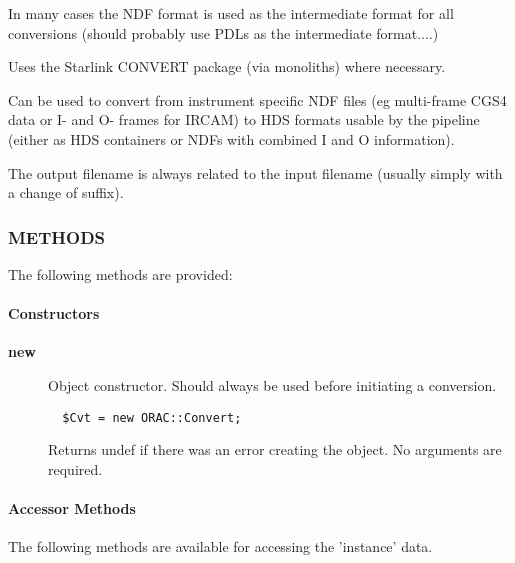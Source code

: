 In many cases the NDF format is used as the intermediate format for
all conversions (should probably use PDLs as the intermediate
format....)



Uses the Starlink CONVERT package (via monoliths) where necessary.



Can be used to convert from instrument specific NDF files (eg
multi-frame CGS4 data or I- and O- frames for IRCAM) to HDS formats
usable by the pipeline (either as HDS containers or NDFs with combined
I and O information).



The output filename is always related to the input filename
(usually simply with a change of suffix).

\subsubsection*{METHODS\label{ORAC::Convert_METHODS}}


The following methods are provided:

\paragraph*{Constructors\label{ORAC::Convert_Constructors}}
\begin{description}

\item[{\textbf{new}}] \mbox{}

Object constructor. Should always be used before initiating a conversion.

\begin{verbatim}
  $Cvt = new ORAC::Convert;
\end{verbatim}


Returns undef if there was an error creating the object. No arguments
are required.

\end{description}
\paragraph*{Accessor Methods\label{ORAC::Convert_Accessor_Methods}}


The following methods are available for accessing the 
'instance' data.

